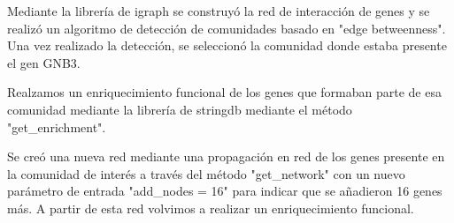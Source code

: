 Mediante la librería de igraph se construyó la red de interacción de genes y se realizó un algoritmo de detección de comunidades basado en "edge betweenness". Una vez realizado la detección, se seleccionó la comunidad donde estaba presente el gen GNB3.

Realzamos un enriquecimiento funcional de los genes que formaban parte de esa comunidad mediante la librería de stringdb mediante el método "get\_enrichment". 

Se creó una nueva red mediante una propagación en red de los genes presente en la comunidad de interés a través del método "get\_network" con un nuevo parámetro de entrada "add\_nodes = 16" para indicar que se añadieron 16 genes más. A partir de esta red volvimos a realizar un enriquecimiento funcional.
